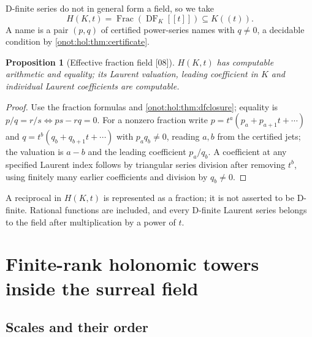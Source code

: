 \documentclass[11pt,oneside]{article}
\numberwithin{equation}{section}
\newtheorem{proposition}[proposition]{Proposition}
\theoremstyle{definition}
\theoremstyle{remark}
\newcommand{\DF}{\operatorname{DF}}
\newcommand{\Frac}{\operatorname{Frac}}
\newcommand{\src}[1]{\textup{\textsf{\small[#1]}}}
\begin{document}
D-finite series do not in general form a field, so we take
\begin{equation}\label{onot:hol:eq:H}
 H(K,t)=\Frac(\DF_K[[t]])\subseteq K((t)).
\end{equation}
A name is a pair $(p,q)$ of certified power-series names with $q\ne0$, a
decidable condition by \cref{onot:hol:thm:certificate}.

\begin{proposition}[Effective fraction field \src{08}]\label{onot:hol:prop:fractions}
$H(K,t)$ has computable arithmetic and equality; its Laurent valuation, leading
coefficient in $K$ and individual Laurent coefficients are computable.
\end{proposition}
\begin{proof}
Use the fraction formulas and \cref{onot:hol:thm:dfclosure}; equality is
$p/q=r/s\iff ps-rq=0$. For a nonzero fraction write $p=t^a(p_a+p_{a+1}t+\cdots)$
and $q=t^b(q_b+q_{b+1}t+\cdots)$ with $p_aq_b\ne0$, reading $a,b$ from the
certified jets; the valuation is $a-b$ and the leading coefficient $p_a/q_b$. A
coefficient at any specified Laurent index follows by triangular series division
after removing $t^b$, using finitely many earlier coefficients and division by
$q_b\ne0$.
\end{proof}
A reciprocal in $H(K,t)$ is represented as a fraction; it is not asserted to be
D-finite. Rational functions are included, and every D-finite Laurent series
belongs to the field after multiplication by a power of $t$.

\section{Finite-rank holonomic towers inside the surreal field}\label{onot:hol:sec:towers}

\subsection{Scales and their order}
\end{document}
